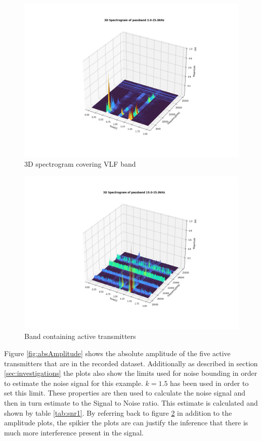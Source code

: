 \begin{figure}[h!]
        \centering
        \includegraphics[width = \textwidth]{figs/sig_character/vlfspectrogram.png}
        \caption{3D spectrogram covering VLF band}
        \label{fig:vlfspect}
\end{figure}
\begin{figure}[h!]
        \centering
        \includegraphics[width = \textwidth]{figs/sig_character/transmitters_spectrogram.png}
        \caption{Band containing active transmitters}
        \label{fig:transSpect}
\end{figure}

Figure \ref{fig:absAmplitude} shows the absolute amplitude of the five active transmitters that are in the recorded dataset. Additionally as described in section \ref{sec:investigations} the plots also show the limits used for noise bounding in order to estimate the noise signal for this example. $k=1.5$ has been used in order to set this limit. These properties are then used to calculate the noise signal and then in turn estimate to the Signal to Noise ratio. This estimate is calculated and shown by table \ref{tab:snr1}. By referring back to figure \ref{fig:transSpect} in addition to the amplitude plots, the spikier the plots are can justify the inference that there is much more interference present in the signal. 

